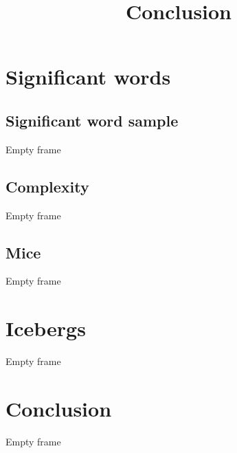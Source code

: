 \documentclass{beamer}
\begin{document}
\section{Significant words}

\subsection{Significant word sample}
\begin{frame}
Empty frame
\end{frame}

\subsection{Complexity}
\begin{frame}
Empty frame
\end{frame}

\subsection{Mice}
\begin{frame}
Empty frame
\end{frame}


\section{Icebergs}

\begin{frame}
Empty frame
\end{frame}



\section*{Conclusion}

\begin{frame}
\title{Conclusion}
Empty frame

\end{frame}

 
\end{document}
